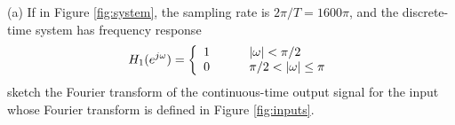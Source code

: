 \documentclass[12pt]{report}
\begin{document}
\noindent
\begin{description}
	\item{(a) }
	If in Figure \ref{fig:system}, the sampling rate is $2\pi /T = 1600\pi$, and the
	discrete-time system has frequency response
	\[
	H_{1}(e^{j\omega}) = \left\{ \begin{array}{ll}
	1 & \hspace*{.3in} |\omega| < \pi/2 \\
	0 & \hspace*{.3in} \pi/2 < |\omega| \leq \pi
	\end{array} \right.
	\]
	sketch the Fourier transform of the continuous-time output signal for the input whose
	Fourier transform is defined in Figure \ref{fig:inputs}.
	

\end{description}
\end{document}
